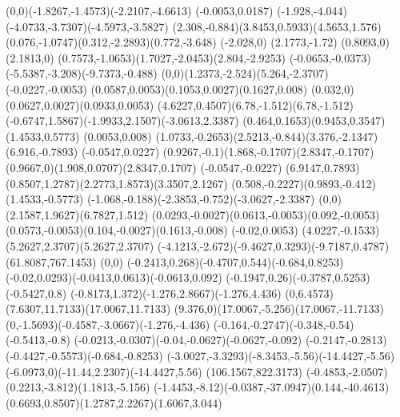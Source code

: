 {    \rcurveto(0,0)(-1.8267,-1.4573)(-2.2107,-4.6613)
    \rlineto(-0.0053,0.0187)
    \rcurveto(-1.928,-4.044)(-4.0733,-3.7307)(-4.5973,-3.5827)
    \rcurveto(2.308,-0.884)(3.8453,0.5933)(4.5653,1.576)
    \rcurveto(0.076,-1.0747)(0.312,-2.2893)(0.772,-3.648)
    \rlineto(-2.028,0)
    \rlineto(2.1773,-1.72)
    \rlineto(0.8093,0)
    \rlineto(2.1813,0)
    \rcurveto(0.7573,-1.0653)(1.7027,-2.0453)(2.804,-2.9253)
    \rcurveto(-0.0653,-0.0373)(-5.5387,-3.208)(-9.7373,-0.488)
    \rcurveto(0,0)(1.2373,-2.524)(5.264,-2.3707)
    \rlineto(-0.0227,-0.0053)
    \rcurveto(0.0587,0.0053)(0.1053,0.0027)(0.1627,0.008)
    \rcurveto(0.032,0)(0.0627,0.0027)(0.0933,0.0053)
    \rcurveto(4.6227,0.4507)(6.78,-1.512)(6.78,-1.512)
    \rcurveto(-0.6747,1.5867)(-1.9933,2.1507)(-3.0613,2.3387)
    \rcurveto(0.464,0.1653)(0.9453,0.3547)(1.4533,0.5773)
    \rlineto(0.0053,0.008)
    \rcurveto(1.0733,-0.2653)(2.5213,-0.844)(3.376,-2.1347)
    \rlineto(6.916,-0.7893)
    \rlineto(-0.0547,0.0227)
    \rcurveto(0.9267,-0.1)(1.868,-0.1707)(2.8347,-0.1707)
    \rcurveto(0.9667,0)(1.908,0.0707)(2.8347,0.1707)
    \rlineto(-0.0547,-0.0227)
    \rlineto(6.9147,0.7893)
    \rcurveto(0.8507,1.2787)(2.2773,1.8573)(3.3507,2.1267)
    \rcurveto(0.508,-0.2227)(0.9893,-0.412)(1.4533,-0.5773)
    \rcurveto(-1.068,-0.188)(-2.3853,-0.752)(-3.0627,-2.3387)
    \rcurveto(0,0)(2.1587,1.9627)(6.7827,1.512)
    \rcurveto(0.0293,-0.0027)(0.0613,-0.0053)(0.092,-0.0053)
    \rcurveto(0.0573,-0.0053)(0.104,-0.0027)(0.1613,-0.008)
    \rlineto(-0.02,0.0053)
    \rcurveto(4.0227,-0.1533)(5.2627,2.3707)(5.2627,2.3707)
    \rcurveto(-4.1213,-2.672)(-9.4627,0.3293)(-9.7187,0.4787)
    \moveto(61.8087,767.1453)
    \rlineto(0,0)
    \rcurveto(-0.2413,0.268)(-0.4707,0.544)(-0.684,0.8253)
    \rcurveto(-0.02,0.0293)(-0.0413,0.0613)(-0.0613,0.092)
    \rcurveto(-0.1947,0.26)(-0.3787,0.5253)(-0.5427,0.8)
    \rcurveto(-0.8173,1.372)(-1.276,2.8667)(-1.276,4.436)
    \rcurveto(0,6.4573)(7.6307,11.7133)(17.0067,11.7133)
    \rcurveto(9.376,0)(17.0067,-5.256)(17.0067,-11.7133)
    \rcurveto(0,-1.5693)(-0.4587,-3.0667)(-1.276,-4.436)
    \rcurveto(-0.164,-0.2747)(-0.348,-0.54)(-0.5413,-0.8)
    \rcurveto(-0.0213,-0.0307)(-0.04,-0.0627)(-0.0627,-0.092)
    \rcurveto(-0.2147,-0.2813)(-0.4427,-0.5573)(-0.684,-0.8253)
    \rcurveto(-3.0027,-3.3293)(-8.3453,-5.56)(-14.4427,-5.56)
    \rcurveto(-6.0973,0)(-11.44,2.2307)(-14.4427,5.56)
    \moveto(106.1567,822.3173)
    \rcurveto(-0.4853,-2.0507)(0.2213,-3.812)(1.1813,-5.156)
    \rcurveto(-1.4453,-8.12)(-0.0387,-37.0947)(0.144,-40.4613)
    \rcurveto(0.6693,0.8507)(1.2787,2.2267)(1.6067,3.044)
}

